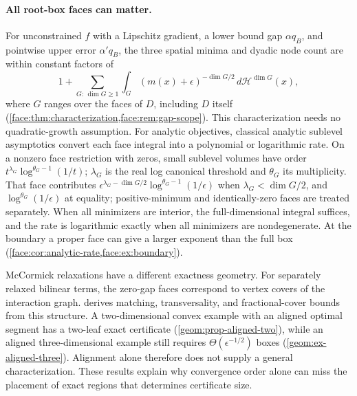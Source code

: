 \paragraph{All root-box faces can matter.}
For unconstrained $f$ with a Lipschitz gradient, a lower bound gap
$\alpha q_B$, and pointwise upper error $\alpha' q_B$, the three spatial
minima and dyadic node count are within constant factors of
\begin{equation}\label{intro:eq-faces}
 1+\sum_{G:\,\dim G\geq1}
 \int_G(m(x)+\epsilon)^{-\dim G/2}\,d\mathcal H^{\dim G}(x),
\end{equation}
where $G$ ranges over the faces of $D$, including $D$ itself
(\cref{face:thm:characterization,face:rem:gap-scope}). This characterization
needs no quadratic-growth
assumption. For analytic objectives, classical analytic sublevel asymptotics
convert each face integral into a polynomial or logarithmic rate. On a
nonzero face restriction with zeros, small sublevel volumes have order
$t^{\lambda_G}\log^{\theta_G-1}(1/t)$; $\lambda_G$ is the real log
canonical threshold and $\theta_G$ its multiplicity. That face contributes
$\epsilon^{\lambda_G-\dim G/2}\log^{\theta_G-1}(1/\epsilon)$ when
$\lambda_G<\dim G/2$, and $\log^{\theta_G}(1/\epsilon)$ at equality;
positive-minimum and identically-zero faces are treated separately.
When all minimizers are interior, the full-dimensional integral suffices,
and the rate is logarithmic exactly when all minimizers are nondegenerate.
At the boundary a proper face can give a larger exponent than the full box
(\cref{face:cor:analytic-rate,face:ex:boundary}).

McCormick relaxations have a different exactness geometry. For separately
relaxed bilinear terms, the zero-gap faces correspond to vertex covers of
the interaction graph.  derives matching, transversality,
and fractional-cover bounds from this structure. A two-dimensional convex
example with an aligned optimal segment has a two-leaf exact certificate
(\cref{geom:prop-aligned-two}), while an aligned three-dimensional example
still requires
$\Theta(\epsilon^{-1/2})$ boxes (\cref{geom:ex-aligned-three}). Alignment
alone therefore does not supply a
general characterization. These results explain why convergence order alone
can miss the placement of exact regions that determines certificate size.

